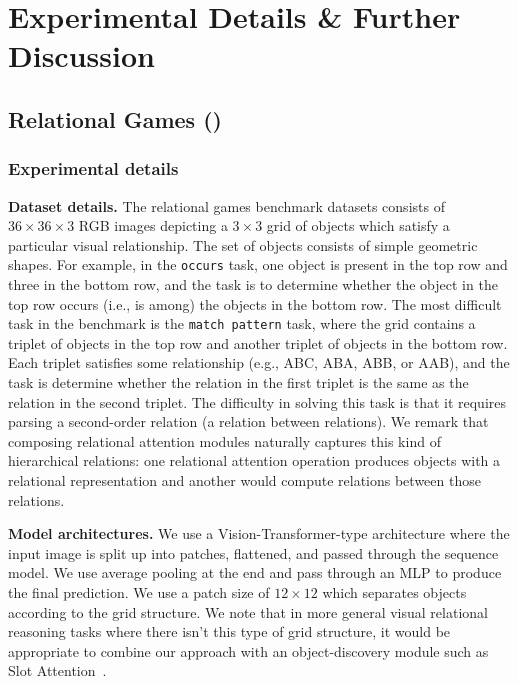 \section{Experimental Details \& Further Discussion}\label{sec:appendix_experimental_details}

\subsection{Relational Games ()}\label{ssec:appendxi_relgames}

\subsubsection*{Experimental details}

\textbf{Dataset details.} The relational games benchmark datasets consists of $36 \times 36 \times 3$ RGB images depicting a $3 \times 3$ grid of objects which satisfy a particular visual relationship. The set of objects consists of simple geometric shapes. For example, in the \texttt{occurs} task, one object is present in the top row and three in the bottom row, and the task is to determine whether the object in the top row occurs (i.e., is among) the objects in the bottom row. The most difficult task in the benchmark is the \texttt{match pattern} task, where the grid contains a triplet of objects in the top row and another triplet of objects in the bottom row. Each triplet satisfies some relationship (e.g., ABC, ABA, ABB, or AAB), and the task is determine whether the relation in the first triplet is the same as the relation in the second triplet. The difficulty in solving this task is that it requires parsing a second-order relation (a relation between relations). We remark that composing relational attention modules naturally captures this kind of hierarchical relations: one relational attention operation produces objects with a relational representation and another would compute relations between those relations.

\textbf{Model architectures.} We use a Vision-Transformer-type architecture where the input image is split up into patches, flattened, and passed through the sequence model. We use average pooling at the end and pass through an MLP to produce the final prediction. We use a patch size of $12 \times 12$ which separates objects according to the grid structure. We note that in more general visual relational reasoning tasks where there isn't this type of grid structure, it would be appropriate to combine our approach with an object-discovery module such as Slot Attention~\citep{locatelloObjectCentricLearningSlot2020}.

